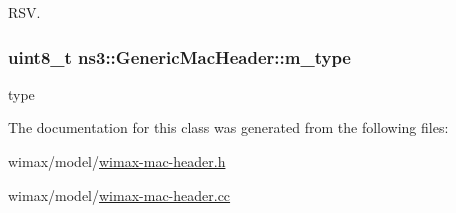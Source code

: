 R\+SV. 

\subsubsection[{\texorpdfstring{m\+\_\+type}{m_type}}]{\setlength{\rightskip}{0pt plus 5cm}uint8\+\_\+t ns3\+::\+Generic\+Mac\+Header\+::m\+\_\+type\hspace{0.3cm}{\ttfamily [private]}}\hypertarget{classns3_1_1GenericMacHeader_ad117be226baa0fd1757cdba611016844}{}\label{classns3_1_1GenericMacHeader_ad117be226baa0fd1757cdba611016844}


type 



The documentation for this class was generated from the following files\+:\begin{DoxyCompactItemize}
\item 
wimax/model/\hyperlink{wimax-mac-header_8h}{wimax-\/mac-\/header.\+h}\item 
wimax/model/\hyperlink{wimax-mac-header_8cc}{wimax-\/mac-\/header.\+cc}\end{DoxyCompactItemize}
